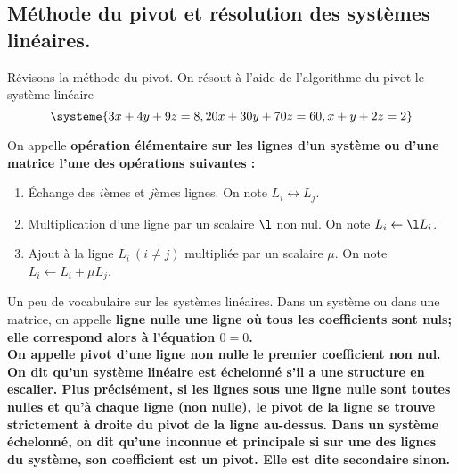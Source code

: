 \documentclass[11pt]{article}
\begin{document}
\subsection{Méthode du pivot et résolution des systèmes linéaires.}

\begin{ex}{Révisons la méthode du pivot.}{}
    On résout à l'aide de l'algorithme du pivot le système linéaire
    \begin{equation*}
        \systeme{
            3x + 4y + 9z = 8,
            20x + 30y + 70z = 60,
            x + y + 2z = 2
        }
    \end{equation*}
\end{ex}

\begin{defi}{}{}
    On appelle \bf{opération élémentaire} sur les lignes d'un système ou d'une matrice l'une des opérations suivantes :
    \begin{enumerate}
        \item Échange des $i$èmes et $j$èmes lignes. On note $L_i\leftrightarrow L_j$.
        \item Multiplication d'une ligne par un scalaire $\l$ non nul. On note $L_i\gets \l L_i$.
        \item Ajout à la ligne $L_i~(i\neq j)$ multipliée par un scalaire $\mu$. On note $L_i \gets L_i+\mu L_j$.
    \end{enumerate}
\end{defi}

\begin{defi}{Un peu de vocabulaire sur les systèmes linéaires.}{}
    Dans un système ou dans une matrice, on appelle \bf{ligne nulle} une ligne où tous les coefficients sont nuls; elle correspond alors à l'équation $0=0$.\\
    On appelle \bf{pivot} d'une ligne non nulle le premier coefficient non nul.\n
    On dit qu'un système linéaire est \bf{échelonné} s'il a une structure en escalier. Plus précisément, si les lignes sous une ligne nulle sont toutes nulles et qu'à chaque ligne (non nulle), le pivot de la ligne se trouve strictement à droite du pivot de la ligne au-dessus.\n
    Dans un système échelonné, on dit qu'une \bf{inconnue} et \bf{principale} si sur une des lignes du système, son coefficient est un pivot. Elle est dite \bf{secondaire} sinon.
\end{defi}
\end{document}
